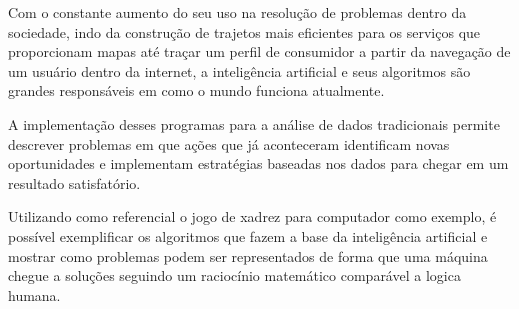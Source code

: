Com o constante aumento do seu uso na resolução de problemas dentro da sociedade, indo da construção de trajetos mais
eficientes para os serviços que proporcionam mapas até traçar um perfil de consumidor a partir da navegação de um usuário
dentro da internet, a inteligência artificial e seus algoritmos são grandes responsáveis em como o mundo funciona atualmente.

A implementação desses programas para a análise de dados tradicionais permite descrever problemas em que ações que já
aconteceram identificam novas oportunidades e implementam estratégias baseadas nos dados para chegar em um resultado
satisfatório.

Utilizando como referencial o jogo de xadrez para computador como exemplo,  é possível exemplificar os algoritmos que fazem
a base da inteligência artificial e mostrar como problemas podem ser representados de forma que uma máquina chegue a soluções
seguindo um raciocínio matemático comparável a logica humana.